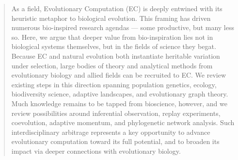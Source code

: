 \begin{abstract}
As a field, Evolutionary Computation (EC) is deeply entwined with its heuristic metaphor to biological evolution.
This framing has driven numerous bio-inspired research agendas --- some productive, but many less so.
Here, we argue that deeper value from bio-inspiration lies not in biological systems themselves, but in the fields of science they begat.
Because EC and natural evolution both instantiate heritable variation under selection, large bodies of theory and analytical methods from evolutionary biology and allied fields can be recruited to EC.
We review existing steps in this direction spanning population genetics, ecology, biodiversity science, adaptive landscapes, and evolutionary graph theory.
Much knowledge remains to be tapped from bioscience, however, and we review possibilities around inferential observation, replay experiments, coevolution, adaptive momentum, and phylogenetic network analysis.
Such interdisciplinary arbitrage represents a key opportunity to advance evolutionary computation toward its full potential, and to broaden its impact via deeper connections with evolutionary biology.
\end{abstract}
